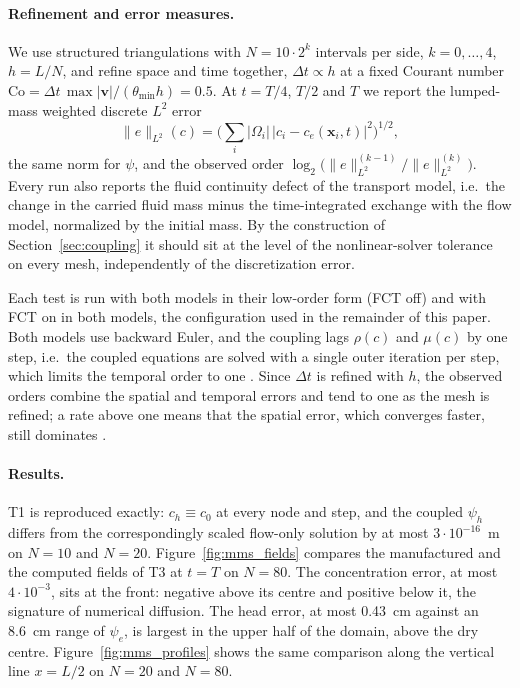 \paragraph{Refinement and error measures.}
We use structured triangulations with $N=10\cdot2^k$ intervals per side,
$k=0,\dots,4$, $h=L/N$, and refine space and time together, $\Delta t\propto h$
at a fixed Courant number
$\mathrm{Co}=\Delta t\,\max|\mathbf{v}|/(\theta_{\min}h)=0.5$. At $t=T/4$,
$T/2$ and $T$ we report the lumped-mass weighted discrete $L^2$ error
\begin{equation}
  \|e\|_{L^2}(c) = \Big(\sum_i |\Omega_i|\,\big|c_i - c_e(\mathbf{x}_i,t)\big|^2\Big)^{1/2},
\end{equation}
the same norm for $\psi$, and the observed order
$\log_2\big(\|e\|^{(k-1)}_{L^2}/\|e\|^{(k)}_{L^2}\big)$. Every run also reports the fluid continuity
defect of the transport model, i.e.\ the change in the carried fluid mass minus
the time-integrated exchange with the flow model, normalized by the initial
mass. By the construction of Section~\ref{sec:coupling} it should sit at the
level of the nonlinear-solver tolerance on every mesh, independently of the
discretization error.

Each test is run with both models in their low-order form (FCT off) and with
FCT on in both models, the configuration used in the remainder of this paper.
Both models use backward Euler, and the coupling lags $\rho(c)$ and $\mu(c)$ by
one step, i.e.\ the coupled equations are solved with a single outer iteration
per step, which limits the temporal order to one \cite{shunn2012}. Since
$\Delta t$ is refined with $h$, the observed orders combine the spatial and
temporal errors and tend to one as the mesh is refined; a rate above one
means that the spatial error, which converges faster, still dominates
\cite{shunn2012}.

\paragraph{Results.}
T1 is reproduced exactly: $c_h\equiv c_0$ at every node and step, and the
coupled $\psi_h$ differs from the correspondingly scaled flow-only solution by
at most $3\cdot10^{-16}$~m on $N=10$ and $N=20$. Figure~\ref{fig:mms_fields}
compares the manufactured and the computed fields of T3 at $t=T$ on $N=80$.
The concentration error, at most $4\cdot10^{-3}$, sits at the front: negative
above its centre and positive below it, the signature of numerical diffusion.
The head error, at most 0.43~cm against an 8.6~cm range of $\psi_e$, is largest
in the upper half of the domain, above the dry centre.
Figure~\ref{fig:mms_profiles} shows the same comparison along the vertical
line $x=L/2$ on $N=20$ and $N=80$.

